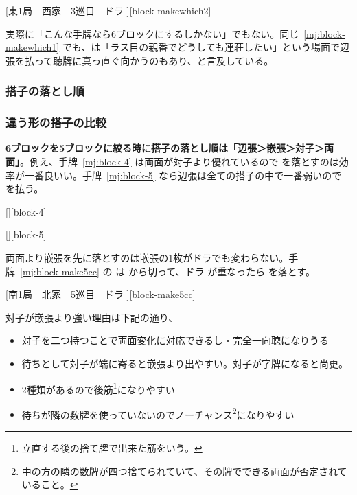 \documentclass[../nankiru_main.tex]{subfiles}
\begin{document}
[東1局　西家　3巡目　ドラ ][block-makewhich2]

実際に「こんな手牌なら6ブロックにするしかない」でもない。同じ~\ref{mj:block-makewhich1} でも、\citet{yoteru-6block}は「ラス目の親番でどうしても連荘したい」という場面で辺張を払って聴牌に真っ直ぐ向かうのもあり、と言及している。

\subsubsection{搭子の落とし順} \label{subsub:6block-order}

\subsubsection*{違う形の搭子の比較}

\textbf{6ブロックを5ブロックに絞る時に搭子の落とし順は「辺張＞嵌張＞対子＞両面」}\citep[][pp. 21--22]{ishibashi-black}。例え、手牌~\ref{mj:block-4} は両面が対子より優れているので  を落とすのは効率が一番良いい。手牌~\ref{mj:block-5} なら辺張は全ての搭子の中で一番弱いので  を払う。

[][block-4]

[][block-5]

両面より嵌張を先に落とすのは嵌張の1枚がドラでも変わらない\citep{yuusee-5block}。手牌~\ref{mj:block-make5cc} の  は  から切って、ドラ  が重なったら  を落とす。

[南1局　北家　5巡目　ドラ ][block-make5cc]

対子が嵌張より強い理由は下記の通り\citep[][pp. 30--33]{uzaku-haikouritsu}\citep{yuusee-kanchan-toitsu}、

\begin{itemize}
\item 対子を二つ持つことで両面変化に対応できるし・完全一向聴になりうる
\item 待ちとして対子が端に寄ると嵌張より出やすい。対子が字牌になると尚更。
\item 2種類があるので後筋\footnote{立直する後の捨て牌で出来た筋をいう。}になりやすい
\item 待ちが隣の数牌を使っていないのでノーチャンス\footnote{中の方の隣の数牌が四つ捨てられていて、その牌でできる両面が否定されていること。}になりやすい
\end{itemize}
\end{document}
